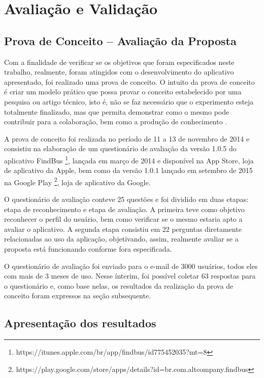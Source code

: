 \chapter{Avaliação e Validação}
\label{ch:avaliacao}

\section{Prova de Conceito – Avaliação da Proposta}
\label{sc:provaConceito}

Com a finalidade de verificar se os objetivos que foram especificados neste trabalho, realmente, foram atingidos com o desenvolvimento do aplicativo apresentado, foi realizado uma prova de conceito. O intuito da prova de conceito é criar um modelo prático que possa provar o conceito estabelecido por uma pesquisa ou artigo técnico, isto é, não se faz necessário que o experimento esteja totalmente finalizado, mas que permita demonstrar como o mesmo pode contribuir para a colaboração, bem como a produção de conhecimento \cite{tornela07}.

A prova de conceito foi realizada no período de 11 a 13 de novembro de 2014 e consistiu na elaboração de um questionário de avaliação da versão 1.0.5  do aplicativo FindBus \footnote{https://itunes.apple.com/br/app/findbus/id775452035?mt=8}, lançada em março de 2014 e disponível na App Store, loja de aplicativo da Apple, bem como da versão 1.0.1 lançado em setembro de 2015 na Google Play \footnote{https://play.google.com/store/apps/details?id=br.com.altcompany.findbus}, loja de aplicativo da Google. 

O questionário de avaliação conteve 25 questões e foi dividido em duas etapas: etapa de reconhecimento e etapa de avaliação. A primeira teve como objetivo reconhecer o perfil do usuário, bem como verificar se o mesmo estaria apto a avaliar o aplicativo. A segunda etapa consistiu em 22 perguntas diretamente relacionadas ao uso da aplicação, objetivando, assim, realmente avaliar se a proposta está funcionando conforme fora especificada. 

O questionário de avaliação foi enviado para o e-mail de 3000 usuários, todos eles com mais de 3 meses de uso. Nesse ínterim, foi possível coletar 63 respostas para o questionário e, como base nelas, os resultados da realização da prova de conceito foram expressos na seção subsequente. 

\section{Apresentação dos resultados}
\label{sc:apresentacaoResultados}

